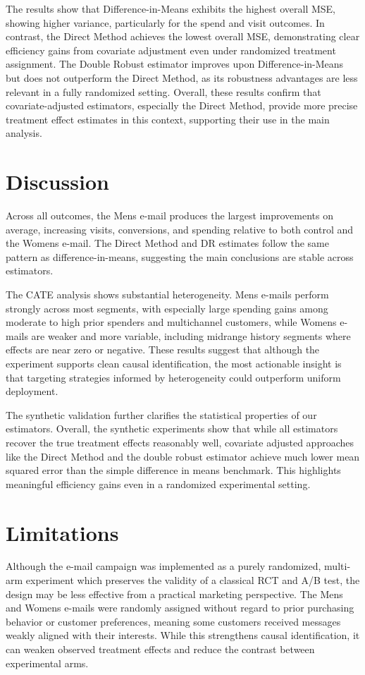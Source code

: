 \documentclass[10pt]{article}
\begin{document}
The results show that Difference-in-Means exhibits the highest overall MSE, showing higher variance, particularly for the spend and visit outcomes. In contrast, the Direct Method achieves the lowest overall MSE, demonstrating clear efficiency gains from covariate adjustment even under randomized treatment assignment. The Double Robust estimator improves upon Difference-in-Means but does not outperform the Direct Method, as its robustness advantages are less relevant in a fully randomized setting. Overall, these results confirm that covariate-adjusted estimators, especially the Direct Method, provide more precise treatment effect estimates in this context, supporting their use in the main analysis.


\section{Discussion}

Across all outcomes, the Mens e-mail produces the largest improvements on average, increasing visits, conversions, and spending relative to both control and the Womens e-mail. The Direct Method and DR estimates follow the same pattern as difference-in-means, suggesting the main conclusions are stable across estimators.

The CATE analysis shows substantial heterogeneity. Mens e-mails perform strongly across most segments, with especially large spending gains among moderate to high prior spenders and multichannel customers, while Womens e-mails are weaker and more variable, including midrange history segments where effects are near zero or negative. These results suggest that although the experiment supports clean causal identification, the most actionable insight is that targeting strategies informed by heterogeneity could outperform uniform deployment.

The synthetic validation further clarifies the statistical properties of our estimators. Overall, the synthetic experiments show that while all estimators recover the true treatment effects reasonably well, covariate adjusted approaches like the Direct Method and the double robust estimator achieve much lower mean squared error than the simple difference in means benchmark. This highlights meaningful efficiency gains even in a randomized experimental setting. 

\section{Limitations}
Although the e-mail campaign was implemented as a purely randomized, multi-arm experiment which  preserves the validity of a classical RCT and A/B test, the design may be less effective from a practical marketing perspective. The Mens and Womens e-mails were randomly assigned without regard to prior purchasing behavior or customer preferences, meaning some customers received messages weakly aligned with their interests. While this strengthens causal identification, it can weaken observed treatment effects and reduce the contrast between experimental arms. 
\end{document}
